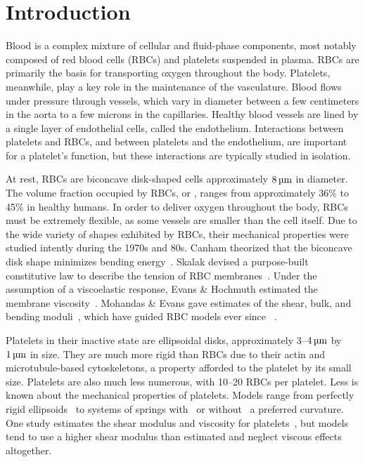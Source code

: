 \section{Introduction}

Blood is a complex mixture of cellular and fluid-phase components, most notably composed of red
blood cells (RBCs) and platelets suspended in plasma. RBCs are primarily the basis for
transporting oxygen throughout the body. Platelets, meanwhile, play a key role in the
maintenance of the vasculature. Blood flows under pressure through vessels, which vary in
diameter between a few centimeters in the aorta to a few microns in the capillaries.
Healthy blood vessels are lined by a single layer of endothelial cells, called the
endothelium.  Interactions between platelets and RBCs, and between platelets and the
endothelium, are important for a platelet's function, but these interactions are
typically studied in isolation.

At rest, RBCs are biconcave disk-shaped cells approximately $8\um$ in diameter. The
volume fraction occupied by RBCs, or , ranges from approximately 36\% to
45\% in healthy humans. In order to deliver oxygen throughout the body, RBCs must be
extremely flexible, as some vessels are smaller than the cell itself. Due to the wide
variety of shapes exhibited by RBCs, their mechanical properties were studied intently
during the 1970s and 80s. Canham theorized that the biconcave disk shape minimizes
bending energy~\cite{Canham:1970wx}. Skalak  devised a purpose-built
constitutive law to describe the tension of RBC membranes~\cite{Skalak:1973tp}. Under the
assumption of a viscoelastic response, Evans \& Hochmuth estimated the membrane
viscosity~\cite{Evans:1976tx}. Mohandas \& Evans gave estimates of the shear, bulk, and
bending moduli~\cite{Mohandas:1994tg}, which have guided RBC models ever since~%
\cite{Pozrikidis:2003ft,Fai:2013do}.

Platelets in their inactive state are ellipsoidal disks, approximately 3--$4\um$ by
$1\um$ in size. They are much more rigid than RBCs due to their actin and microtubule-based
cytoskeletons, a property afforded to the platelet by its small size. Platelets are also
much less numerous, with 10--20 RBCs per platelet. Less is known about the mechanical
properties of platelets. Models range from perfectly rigid ellipsoids~\cite{Wang:2013gs}
to systems of springs with~\cite{Erickson:2010ep,Skorczewski:2013jn} or without~%
\cite{Wu:2014gt} a preferred curvature. One study estimates the shear modulus and
viscosity for platelets~\cite{Haga:1998wa}, but models tend to use a higher shear modulus
than estimated and neglect viscous effects altogether.

